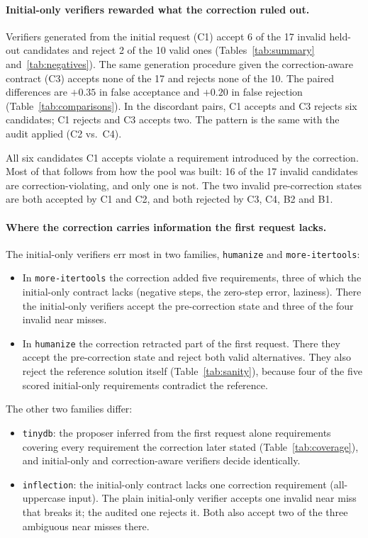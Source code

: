 \paragraph{Initial-only verifiers rewarded what the correction ruled out.} Verifiers generated from the initial request (C1) accept 6 of the 17 invalid held-out candidates and reject 2 of the 10 valid ones (Tables~\ref{tab:summary} and~\ref{tab:negatives}). The same generation procedure given the correction-aware contract (C3) accepts none of the 17 and rejects none of the 10. The paired differences are $+0.35$ in false acceptance and $+0.20$ in false rejection (Table~\ref{tab:comparisons}). In the discordant pairs, C1 accepts and C3 rejects six candidates; C1 rejects and C3 accepts two. The pattern is the same with the audit applied (C2 vs.\ C4).

All six candidates C1 accepts violate a requirement introduced by the correction. Most of that follows from how the pool was built: 16 of the 17 invalid candidates are correction-violating, and only one is not. The two invalid pre-correction states are both accepted by C1 and C2, and both rejected by C3, C4, B2 and B1.

\paragraph{Where the correction carries information the first request lacks.} The initial-only verifiers err most in two families, \texttt{humanize} and \texttt{more-itertools}:
\begin{itemize}
\item In \texttt{more-itertools} the correction added five requirements, three of which the initial-only contract lacks (negative steps, the zero-step error, laziness). There the initial-only verifiers accept the pre-correction state and three of the four invalid near misses.
\item In \texttt{humanize} the correction retracted part of the first request. There they accept the pre-correction state and reject both valid alternatives. They also reject the reference solution itself (Table~\ref{tab:sanity}), because four of the five scored initial-only requirements contradict the reference.
\end{itemize}
The other two families differ:
\begin{itemize}
\item \texttt{tinydb}: the proposer inferred from the first request alone requirements covering every requirement the correction later stated (Table~\ref{tab:coverage}), and initial-only and correction-aware verifiers decide identically.
\item \texttt{inflection}: the initial-only contract lacks one correction requirement (all-uppercase input). The plain initial-only verifier accepts one invalid near miss that breaks it; the audited one rejects it. Both also accept two of the three ambiguous near misses there.
\end{itemize}

